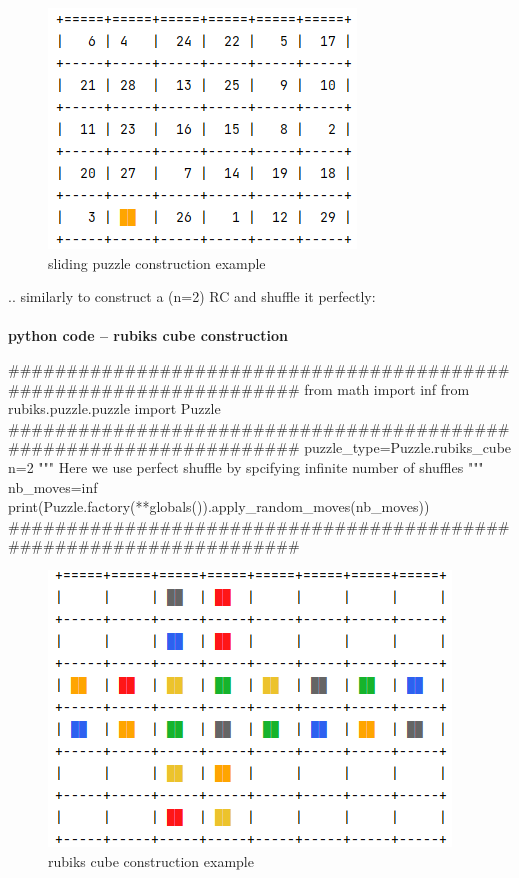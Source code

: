 \begin{figure}[H]
\centering
\includegraphics[scale=0.8]{./Figures/examplespconstruction}
\caption[Examples]{sliding puzzle construction example}
\label{fig:examplespconstruction}
\end{figure}
.. similarly to construct a (n=2) RC and shuffle it perfectly:
\afblue
\paragraph{}{\textbf{python code -- rubiks cube construction}}
\begin{python}
####################################################################
from math import inf
from rubiks.puzzle.puzzle import Puzzle
####################################################################
puzzle_type=Puzzle.rubiks_cube
n=2
""" Here we use perfect shuffle by spcifying infinite number of shuffles """
nb_moves=inf
print(Puzzle.factory(**globals()).apply_random_moves(nb_moves))
####################################################################
\end{python}
\black

\begin{figure}[H]
\centering
\includegraphics[scale=0.8]{./Figures/examplercconstruction}
\caption[Examples]{rubiks cube construction example}
\label{fig:examplercconstruction}
\end{figure}

